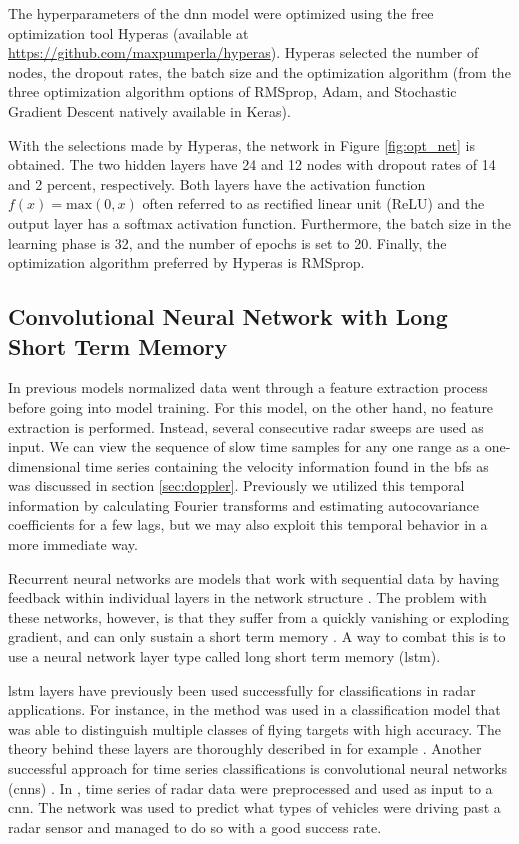 The hyperparameters of the \gls{dnn} model were optimized using the free optimization tool Hyperas (available at \url{https://github.com/maxpumperla/hyperas}). Hyperas selected the number of nodes, the dropout rates, the batch size and the optimization algorithm (from the three optimization algorithm options of RMSprop, Adam, and Stochastic Gradient Descent natively available in Keras). 

With the selections made by Hyperas, the network in Figure \ref{fig:opt_net} is obtained. The two hidden layers have 24 and 12 nodes with dropout rates of 14 and 2 percent, respectively. Both layers have the activation function $f(x)=\textrm{max}(0,x)$ often referred to as rectified linear unit (ReLU) and the output layer has a softmax activation function. Furthermore, the batch size in the learning phase is 32, and the number of epochs is set to 20. Finally, the optimization algorithm preferred by Hyperas is RMSprop.

\subsection{Convolutional Neural Network with Long Short Term Memory}

In previous models normalized data went through a feature extraction process before going into model training. For this model, on the other hand, no feature extraction is performed. Instead, several consecutive radar sweeps are used as input. We can view the sequence of slow time samples for any one range as a one-dimensional time series containing the velocity information found in the \gls{bf}s as was discussed in section \ref{sec:doppler}. Previously we utilized this temporal information by calculating Fourier transforms and estimating autocovariance coefficients for a few lags, but we may also exploit this temporal behavior in a more immediate way.

Recurrent neural networks are models that work with sequential data by having feedback within individual layers in the network structure \citep{karim_majumdar_darabi_chen_2018}. The problem with these networks, however, is that they suffer from a quickly vanishing or exploding gradient, and can only sustain a short term memory \citep{pascanu_mikolov_bengio_2013}. A way to combat this is to use a neural network layer type called long short term memory (\gls{lstm}).

\gls{lstm} layers have previously been used successfully for classifications in radar applications. For instance, in \citep{jithesh_sagayaraj_srinivasa_2017} the method was used in a classification model that was able to distinguish multiple classes of flying targets with high accuracy. The theory behind these layers are thoroughly described in for example \citep{hochreiter_schmidhuber_1997}. Another successful approach for time series classifications is convolutional neural networks (\gls{cnn}s) \citep{karim_majumdar_darabi_chen_2018}. In \citep{capobianco_facheris_cuccoli_marinai_2018}, time series of radar data were preprocessed and used as input to a \gls{cnn}. The network was used to predict what types of vehicles were driving past a radar sensor and managed to do so with a good success rate.

